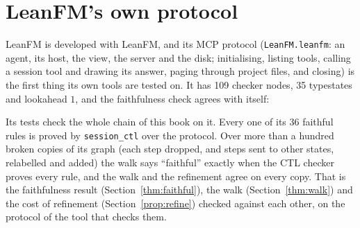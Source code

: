 \section{LeanFM's own protocol}

LeanFM is developed with LeanFM, and its MCP protocol (\texttt{LeanFM.leanfm}: an agent, its host, the view, the
server and the disk; initialising, listing tools, calling a session tool and drawing its
answer, paging through project files, and closing) is the first thing
its own tools are tested on. It has 109 checker nodes, 35 typestates and lookahead $1$,
and the faithfulness check agrees with itself:


Its tests check the whole chain of this book on it. Every one of its 36 faithful rules
is proved by \texttt{session\_ctl} over the protocol. Over more than a hundred broken
copies of its graph (each step dropped, and steps sent to other states, relabelled and
added) the walk says ``faithful'' exactly when the CTL checker proves every rule, and the
walk and the refinement agree on every copy. That is the faithfulness result (Section~\ref{thm:faithful}),
the walk (Section~\ref{thm:walk}) and the cost of refinement (Section~\ref{prop:refine}) checked against each other, on
the protocol of the tool that checks them.
